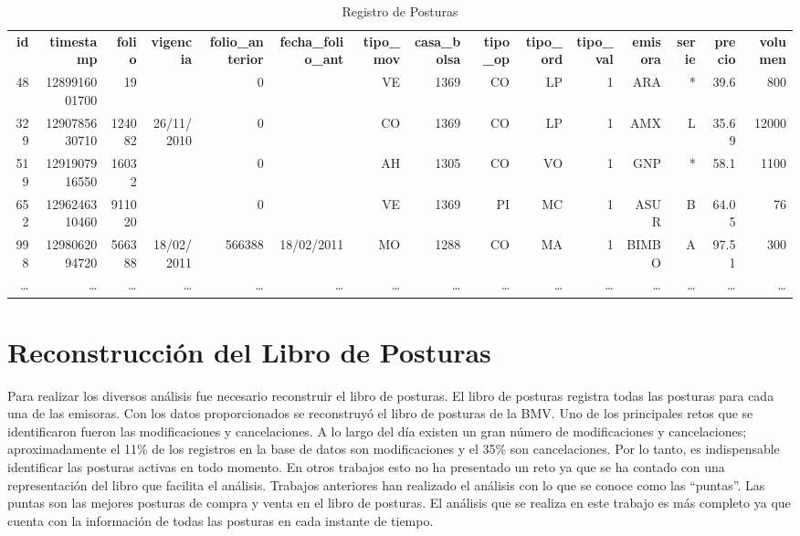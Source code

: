 \documentclass[11pt]{article}
\numberwithin{equation}{section} %
\begin{document}
\begin{landscape}
\begin{table}[htbp]\scriptsize
\centering
\caption{ Registro de Posturas}
\setlength\tabcolsep{1.25pt}
\begin{tabular}{rrrrrrrrrrrrrrr}
\textbf{ id}    & \textbf{timestamp} & \textbf{folio} & \textbf{vigencia} & \textbf{folio\_anterior} & \textbf{fecha\_folio\_ant} & \textbf{tipo\_mov} & \textbf{casa\_bolsa} & \textbf{tipo\_op} & \textbf{tipo\_ord} & \textbf{tipo\_val} & \textbf{emisora} & \textbf{serie} & \textbf{precio} & \textbf{volumen} \\
48 & 1289916001700 & 19    &       & 0     &       & VE    & 1369  & CO    & LP    & 1     & ARA & *     & 39.6  & 800 \\
329 & 1290785630710 & 124082 & 26/11/2010 & 0     &       & CO    & 1369  & CO    & LP    & 1     & AMX   & L     & 35.69 & 12000 \\
519 & 1291907916550 & 16032 &       & 0     &       & AH    & 1305  & CO    & VO    & 1     & GNP & *     & 58.1  & 1100 \\
652 & 1296246310460 & 911020 &       & 0     &       & VE    & 1369  & PI    & MC    & 1     & ASUR  & B     & 64.05 & 76 \\
998 & 1298062094720 & 566388 & 18/02/2011 & 566388 & 18/02/2011 & MO    & 1288  & CO    & MA    & 1     & BIMBO & A     & 97.51 & 300 \\
\ldots & \ldots & \ldots & \ldots & \ldots & \ldots & \ldots & \ldots & \ldots & \ldots & \ldots & \ldots & \ldots & \ldots & \ldots \\
\end{tabular}%
\label{tab:regposturasl}%
\end{table}%

\end{landscape}

\clearpage

\section{Reconstrucción del Libro de Posturas}

Para realizar los diversos análisis fue necesario reconstruir el libro de posturas. El libro de posturas registra todas las posturas para cada una de las emisoras. Con los datos proporcionados se reconstruyó el libro de posturas de la BMV. Uno de los principales retos que se identificaron fueron las modificaciones y cancelaciones. A lo largo del día existen un gran número de modificaciones y cancelaciones; aproximadamente el 11\% de los registros en la base de datos son modificaciones y el 35\% son cancelaciones. Por lo tanto, es indispensable identificar las posturas activas en todo momento. En otros trabajos esto no ha presentado un reto ya que se ha contado con una representación del libro que facilita el análisis. Trabajos anteriores han realizado el análisis con lo que se conoce como las ``puntas''. Las puntas son las mejores posturas de compra y venta en el libro de posturas. El análisis que se realiza en este trabajo es más completo ya que cuenta con la información de todas las posturas en cada instante de tiempo.\\
\end{document}

